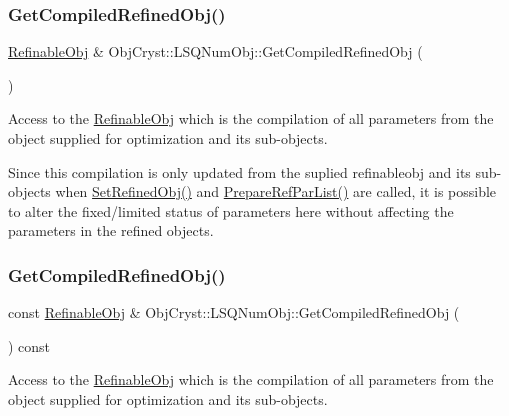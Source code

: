 \subsubsection{\texorpdfstring{GetCompiledRefinedObj()}{GetCompiledRefinedObj()}\hspace{0.1cm}{\footnotesize\ttfamily [1/2]}}
{\footnotesize\ttfamily \mbox{\hyperlink{class_obj_cryst_1_1_refinable_obj}{Refinable\+Obj}} \& Obj\+Cryst\+::\+L\+S\+Q\+Num\+Obj\+::\+Get\+Compiled\+Refined\+Obj (\begin{DoxyParamCaption}{ }\end{DoxyParamCaption})}

Access to the \mbox{\hyperlink{class_obj_cryst_1_1_refinable_obj}{Refinable\+Obj}} which is the compilation of all parameters from the object supplied for optimization and its sub-\/objects.

Since this compilation is only updated from the suplied refinableobj and its sub-\/objects when \mbox{\hyperlink{class_obj_cryst_1_1_l_s_q_num_obj_ac093bab1bcb43aa4ea00f63fdb53063f}{Set\+Refined\+Obj()}} and \mbox{\hyperlink{class_obj_cryst_1_1_l_s_q_num_obj_afdeb58450a3e0506fc02a0b5df15a600}{Prepare\+Ref\+Par\+List()}} are called, it is possible to alter the fixed/limited status of parameters here without affecting the parameters in the refined objects. \mbox{\label{class_obj_cryst_1_1_l_s_q_num_obj_a6ddb54f933db8da5d006ed964a96fa94}} 
\subsubsection{\texorpdfstring{GetCompiledRefinedObj()}{GetCompiledRefinedObj()}\hspace{0.1cm}{\footnotesize\ttfamily [2/2]}}
{\footnotesize\ttfamily const \mbox{\hyperlink{class_obj_cryst_1_1_refinable_obj}{Refinable\+Obj}} \& Obj\+Cryst\+::\+L\+S\+Q\+Num\+Obj\+::\+Get\+Compiled\+Refined\+Obj (\begin{DoxyParamCaption}{ }\end{DoxyParamCaption}) const}

Access to the \mbox{\hyperlink{class_obj_cryst_1_1_refinable_obj}{Refinable\+Obj}} which is the compilation of all parameters from the object supplied for optimization and its sub-\/objects.

